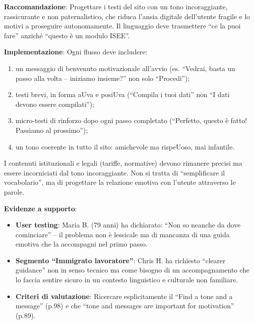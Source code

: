\documentclass[11pt,a4paper]{article}
\begin{document}
\textbf{Raccomandazione}: Progettare i testi del sito con un tono
incoraggiante, rassicurante e non paternalistico, che riduca l'ansia
digitale dell'utente fragile e lo motivi a proseguire autonomamente.
Il linguaggio deve trasmettere ``ce la puoi fare'' anzich\'e ``questo \`e
un modulo ISEE''.

\textbf{Implementazione}: Ogni flusso deve includere:
\begin{enumerate}
    \item un messaggio di benvenuto motivazionale all'avvio (es. ``Vedrai,
    basta un passo alla volta -- iniziamo insieme?'' non solo ``Procedi'');
    \item testi brevi, in forma aUva e posiUva (``Compila i tuoi dati''
    non ``I dati devono essere compilati'');
    \item micro-testi di rinforzo dopo ogni passo completato (``Perfetto,
    questo \`e fatto! Passiamo al prossimo'');
    \item un tono coerente in tutto il sito: amichevole ma rispeUoso,
    mai infantile.
\end{enumerate}
I contenuti istituzionali e legali (tariffe, normative) devono rimanere
precisi ma essere incorniciati dal tono incoraggiante. Non si tratta di
``semplificare il vocabolario'', ma di progettare la relazione emotiva
con l'utente attraverso le parole.

\textbf{Evidenze a supporto}:
\begin{itemize}
    \item \textbf{User testing}: Maria B. (79 anni) ha dichiarato: ``Non so
    neanche da dove cominciare'' -- il problema non \`e lessicale ma di
    mancanza di una guida emotiva che la accompagni nel primo passo.
    \item \textbf{Segmento ``Immigrato lavoratore''}: Chris H. ha richiesto
    ``clearer guidance'' non in senso tecnico ma come bisogno di un
    accompagnamento che lo faccia sentire sicuro in un contesto
    linguistico e culturale non familiare.
    \item \textbf{Criteri di valutazione}: Ricercare
    esplicitamente il ``Find a tone and a message'' (p.98) e che
    ``tone and messages are important for motivation'' (p.89).
\end{itemize}


\end{document}
